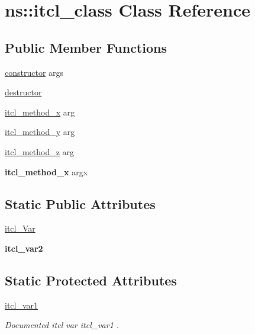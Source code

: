 \hypertarget{classns_1_1itcl__class}{}\section{ns\+::itcl\+\_\+class Class Reference}
\label{classns_1_1itcl__class}
\subsection*{Public Member Functions}
\begin{DoxyCompactItemize}
\item 
\mbox{\hyperlink{classns_1_1itcl__class_a8ba2ba9d7bcb63b99a765e8f6003134b}{constructor}} args
\item 
\mbox{\hyperlink{classns_1_1itcl__class_ac72f3174993656391f9b54487aa4795e}{destructor}}
\item 
\mbox{\hyperlink{classns_1_1itcl__class_abc59160f823f3a6ec8c292c034aedbc3}{itcl\+\_\+method\+\_\+x}} arg
\item 
\mbox{\hyperlink{classns_1_1itcl__class_a092d0f8ed4796902e41fbeb1dfed82f1}{itcl\+\_\+method\+\_\+y}} arg
\item 
\mbox{\hyperlink{classns_1_1itcl__class_a13a383c766e489814960345540106cc1}{itcl\+\_\+method\+\_\+z}} arg
\item 
\mbox{\label{classns_1_1itcl__class_aad1f81467f2fca0dc02e527e786513a4}} 
{\bfseries itcl\+\_\+method\+\_\+x} argx
\end{DoxyCompactItemize}
\subsection*{Static Public Attributes}
\begin{DoxyCompactItemize}
\item 
\mbox{\hyperlink{classns_1_1itcl__class_a8df46696ce554fed04d170932260fbb8}{itcl\+\_\+\+Var}}
\item 
\mbox{\label{classns_1_1itcl__class_abaf3c744194c1b3ae68fb0ba70d8786e}} 
{\bfseries itcl\+\_\+var2}
\end{DoxyCompactItemize}
\subsection*{Static Protected Attributes}
\begin{DoxyCompactItemize}
\item 
\mbox{\label{classns_1_1itcl__class_ae515e43ca6bb755d116416f94a13d344}} 
\mbox{\hyperlink{classns_1_1itcl__class_ae515e43ca6bb755d116416f94a13d344}{itcl\+\_\+var1}}
\begin{DoxyCompactList}\small\item\em Documented itcl var {\ttfamily itcl\+\_\+var1} . \end{DoxyCompactList}\end{DoxyCompactItemize}


